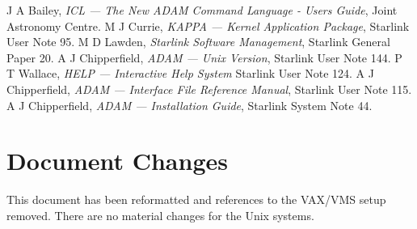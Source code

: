 \documentclass[twoside,11pt]{article}
\newcommand{\xlabel}[1]{}
\renewcommand{\_}{\texttt{\symbol{95}}}
\begin{document}
\begin{thebibliography}{9}
 J A Bailey, \textit{ICL --- The New ADAM Command Language - Users
Guide}, Joint Astronomy Centre.
 M J Currie, \textit{KAPPA --- Kernel Application Package},
Starlink User Note 95.
 M D Lawden, \textit{Starlink Software Management}, Starlink
General Paper 20.
 A J Chipperfield, \textit{ADAM --- Unix Version},
Starlink User Note 144.
 P T Wallace, \textit{HELP --- Interactive Help System}
Starlink User Note 124.
 A J Chipperfield, \textit{ADAM --- Interface File Reference Manual},
Starlink User Note 115.
 A J Chipperfield, \textit{ADAM --- Installation Guide}, Starlink
System Note 44.
\end{thebibliography}

\section{\xlabel{document_changes}Document Changes}
\label{changes}
This document has been reformatted and references to the VAX/VMS setup removed.
There are no material changes for the Unix systems.
\end{document}
